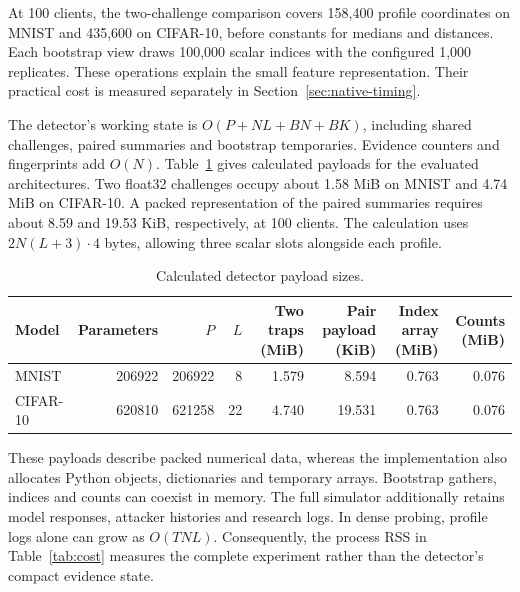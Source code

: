 \documentclass[conference]{IEEEtran}
\makeatletter
\renewcommand{\subsection}{\@startsection{subsection}{2}{\z@}{1.5ex}{0.7ex}{\normalfont\normalsize\itshape}}
\makeatother
\begin{document}
At 100 clients, the two-challenge comparison covers 158,400 profile
coordinates on MNIST and 435,600 on CIFAR-10, before constants for
medians and distances. Each bootstrap view draws 100,000 scalar indices
with the configured 1,000 replicates. These operations explain the small
feature representation. Their practical cost is measured separately in
Section~\ref{sec:native-timing}.

\subsection{Memory and Communication}
The detector's working state is
$O(P+NL+BN+BK)$, including shared challenges, paired summaries and
bootstrap temporaries. Evidence counters and fingerprints add $O(N)$.
Table~\ref{tab:payload} gives calculated payloads for the evaluated
architectures. Two float32 challenges occupy about 1.58 MiB on MNIST and
4.74 MiB on CIFAR-10. A packed representation of the paired summaries
requires about 8.59 and 19.53 KiB, respectively, at 100 clients.
The calculation uses $2N(L+3)\cdot4$ bytes, allowing three scalar slots
alongside each profile.

\begin{table}[t]\centering\footnotesize
\caption{Calculated detector payload sizes.}\label{tab:payload}
\begin{tabular}{lrrrrrrr}\toprule
Model & Parameters & $P$ & $L$ & Two traps (MiB) & Pair payload (KiB) & Index array (MiB) & Counts (MiB) \\ \midrule
MNIST & 206922 & 206922 & 8 & 1.579 & 8.594 & 0.763 & 0.076 \\
CIFAR-10 & 620810 & 621258 & 22 & 4.740 & 19.531 & 0.763 & 0.076 \\
\bottomrule\end{tabular}\end{table}



These payloads describe packed numerical data, whereas the implementation
also allocates Python objects, dictionaries and temporary arrays.
Bootstrap gathers, indices and counts can coexist in memory. The full
simulator additionally retains model responses, attacker histories and
research logs. In dense probing, profile logs alone can grow as
$O(TNL)$. Consequently, the process RSS in Table~\ref{tab:cost} measures
the complete experiment rather than the detector's compact evidence
state.
\end{document}
